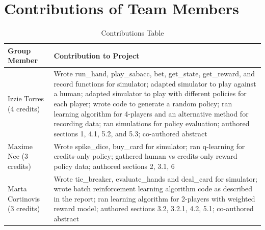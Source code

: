 \documentclass{article}
\begin{document}
\section*{Contributions of Team Members}
\begin{table}[H]
    \begin{center}
    \caption{Contributions Table}
    \begin{tabular}{ p{1in} | p{5in} } 
        \textbf{Group Member} & \textbf{Contribution to Project} \\  \hline
        Izzie Torres (4 credits) & Wrote run\_hand, play\_sabacc, bet, get\_state, get\_reward, and record functions for simulator; adapted simulator to play against a human; adapted simulator to play with different policies for each player; wrote code to generate a random policy; ran learning algorithm for 4-players and an alternative method for recording data; ran simulations for policy evaluation; authored sections 1, 4.1, 5.2, and 5.3; co-authored abstract\\ \hline
        Maxime Nee (3 credits)& Wrote spike\_dice, buy\_card for simulator; ran q-learning for credits-only policy; gathered human vs credits-only reward policy data; authored sections 2, 3.1, 6\\ \hline
        Marta Cortinovis (3 credits) & Wrote tie\_breaker, evaluate\_hands and deal\_card for simulator; wrote batch reinforcement learning algorithm  code as described in the report; ran learning algorithm for 2-players  with weighted reward model; authored sections 3.2, 3.2.1, 4.2, 5.1; co-authored abstract\\
    \end{tabular}
    \end{center}
\end{table}

\end{document}
